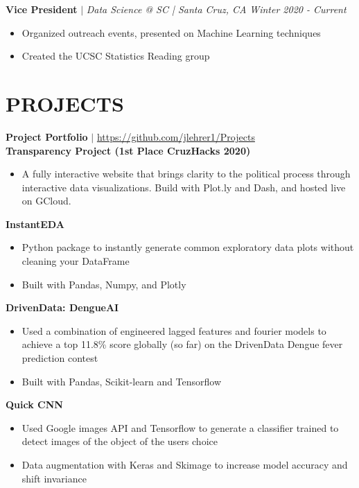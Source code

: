 \documentclass[margin]{res}
\begin{document}
\begin{resume}
    \textbf{Vice President} $\mid$ \textit{Data Science @ SC | Santa Cruz, CA} \hfill {\sl Winter 2020 - Current}
    \begin{itemize}
        \item Organized outreach events, presented on Machine Learning techniques
        \item Created the UCSC Statistics Reading group
    \end{itemize} \vspace*{-10pt}
\section{PROJECTS}
    \textbf{Project Portfolio} $\mid$ \textcolor{blue}{\href{https://github.com/jlehrer1/Projects}{https://github.com/jlehrer1/Projects}} \vspace {2mm} \\
    \textbf{Transparency Project (1st Place CruzHacks 2020)}
    \begin{itemize}
        \item A fully interactive website that brings clarity to the political process through interactive data visualizations. Build with Plot.ly and Dash, and hosted live on GCloud.
    \end{itemize}\vspace*{-8pt}
    \textbf{InstantEDA}
    \begin{itemize}
        \item Python package to instantly generate common exploratory data plots without cleaning your DataFrame
        \item Built with Pandas, Numpy, and Plotly 
    \end{itemize}\vspace*{-8pt}
    \textbf{DrivenData: DengueAI}
    \begin{itemize}
        \item Used a combination of engineered lagged features and fourier models to achieve a top 11.8\% score globally (so far) on the DrivenData Dengue fever prediction contest
        \item Built with Pandas, Scikit-learn and Tensorflow
    \end{itemize}\vspace*{-8pt}
    \textbf{Quick CNN}
    \begin{itemize}
        \item Used Google images API and Tensorflow to generate a classifier  trained to detect images of the object of the users choice
        \item Data augmentation with Keras and Skimage to increase model accuracy and shift invariance
    \end{itemize}\vspace*{-8pt}

\end{resume}
\end{document}
